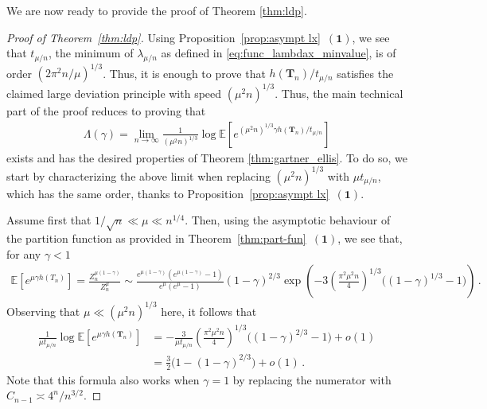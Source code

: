 \documentclass{article}
\newcommand{\E}{\mathbb{E}}								%
\newcommand{\1}{\mathbbm{1}}								%
\theoremstyle{definition}
\numberwithin{equation}{section}
\newcommand{\numitem}[1]{$\mathbf{(#1)}$}
\begin{document}
We are now ready to provide the proof of Theorem \ref{thm:ldp}.
\begin{proof}[Proof of Theorem~\ref{thm:ldp}]
    
    Using Proposition~\ref{prop:asympt lx}~\numitem{1}, 
    we see that $t_{\mu/n}$, the minimum of $\lambda_{\mu/n}$ as defined in \eqref{eq:func_lambdax_minvalue}, is of order $(2\pi^2n/\mu)^{1/3}$.
    Thus, it is enough to prove that $h(\mathbf{T}_n)/t_{\mu/n}$ satisfies the claimed large deviation principle with speed $(\mu^2 n)^{1/3}$.
    Thus, the main technical part of the proof reduces to proving that
    \begin{align*}
        \Lambda(\gamma)=\lim_{n\rightarrow\infty}\frac{1}{(\mu^2n)^{1/3}}\log\E\left[e^{(\mu^2n)^{1/3}\gamma h(\mathbf{T}_n)/t_{\mu/n}}\right]
    \end{align*}
    exists and has the desired properties of Theorem \ref{thm:gartner_ellis}.
    To do so, we start by characterizing the above limit when replacing $(\mu^2n)^{1/3}$ with $\mu t_{\mu/n}$, which has the same order, thanks to Proposition~\ref{prop:asympt lx}~\numitem{1}.

    Assume first that $1/\sqrt{n}\ll\mu\ll n^{1/4}$.
    Then, using the asymptotic behaviour of the partition function as provided in Theorem~\ref{thm:part-fun}~\numitem{1}, we see that, for any $\gamma<1$
    \begin{align*}
        \E\left[e^{\mu\gamma h(T_n)}\right]=\frac{Z_n^{\mu(1-\gamma)}}{Z_n^\mu}\sim\frac{e^{\mu(1-\gamma)}(e^{\mu(1-\gamma)}-1)}{e^\mu(e^\mu-1)}(1-\gamma)^{2/3}\exp\left(-3\left(\frac{\pi^2\mu^2n}{4}\right)^{1/3}\Big((1-\gamma)^{1/3}-1\Big)\right)\,.
    \end{align*}
    Observing that $\mu\ll(\mu^2n)^{1/3}$ here, it follows that
    \begin{align*}
        \frac{1}{\mu t_{\mu/n}}\log\E\left[e^{\mu\gamma h(\mathbf{T}_n)}\right]&=-\frac{3}{\mu t_{\mu/n}}\left(\frac{\pi^2\mu^2n}{4}\right)^{1/3}\Big((1-\gamma)^{2/3}-1\Big)+o(1)\\
        &=\frac{3}{2}\Big(1-(1-\gamma)^{2/3}\Big)+o(1)\,.
    \end{align*}
    Note that this formula also works when $\gamma=1$ by replacing the numerator with $C_{n-1}\asymp 4^n/n^{3/2}$.
    

\end{proof}
\end{document}
